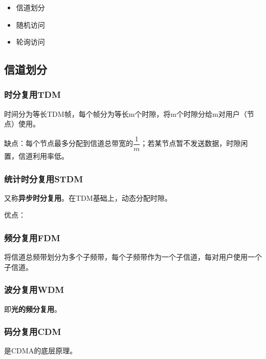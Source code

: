 \begin{itemize}
    \item 信道划分
    \item 随机访问
    \item 轮询访问
\end{itemize}

\subsection{信道划分}

\subsubsection{时分复用TDM}
时间分为等长TDM帧，每个帧分为等长m个时隙，将m个时隙分给m对用户（节点）使用。

缺点：每个节点最多分配到信道总带宽的\(\dfrac{1}{m}\)；若某节点暂不发送数据，时隙闲置，信道利用率低。


\subsubsection{统计时分复用STDM}
又称\textbf{异步时分复用}。在TDM基础上，动态分配时隙。

优点：


\subsubsection{频分复用FDM}
将信道总频带划分为多个子频带，每个子频带作为一个子信道，每对用户使用一个子信道。


\subsubsection{波分复用WDM}
即\textbf{光的频分复用}。


\subsubsection{码分复用CDM}
是CDMA的底层原理。

